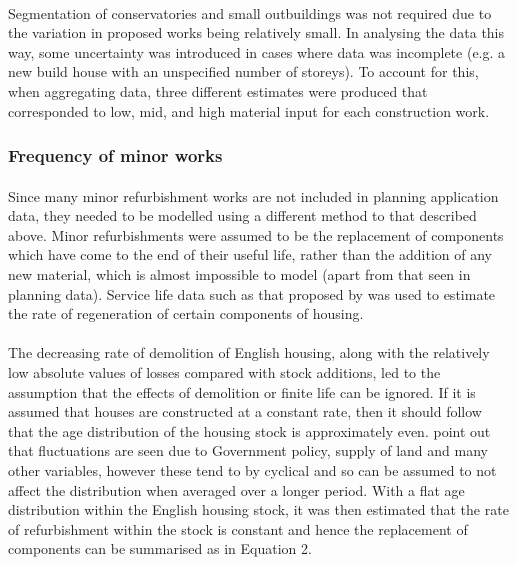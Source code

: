\documentclass[12pt]{article}
\begin{document}
\paragraph{}
Segmentation of conservatories and small outbuildings was not required due to the variation in proposed works being relatively small. In analysing the data this way, some uncertainty was introduced in cases where data was incomplete (e.g. a new build house with an unspecified number of storeys). To account for this, when aggregating data, three different estimates were produced that corresponded to low, mid, and high material input for each construction work.

\subsubsection{Frequency of minor works}
\label{FreqMinor}

\paragraph{}
Since many minor refurbishment works are not included in planning application data, they needed to be modelled using a different method to that described above. Minor refurbishments were assumed to be the replacement of components which have come to the end of their useful life, rather than the addition of any new material, which is almost impossible to model (apart from that seen in planning data). Service life data such as that proposed by \citet{Dixit2019-bj} was used to estimate the rate of regeneration of certain components of housing.

\paragraph{}
The decreasing rate of demolition of English housing, along with the relatively low absolute values of losses compared with stock additions, led to the assumption that the effects of demolition or finite life can be ignored. If it is assumed that houses are constructed at a constant rate, then it should follow that the age distribution of the housing stock is approximately even. \citet{Adams2008-ae} point out that fluctuations are seen due to Government policy, supply of land and many other variables, however these tend to by cyclical and so can be assumed to not affect the distribution when averaged over a longer period. With a flat age distribution within the English housing stock, it was then estimated that the rate of refurbishment within the stock is constant and hence the replacement of components can be summarised as in Equation 2.
\end{document}
